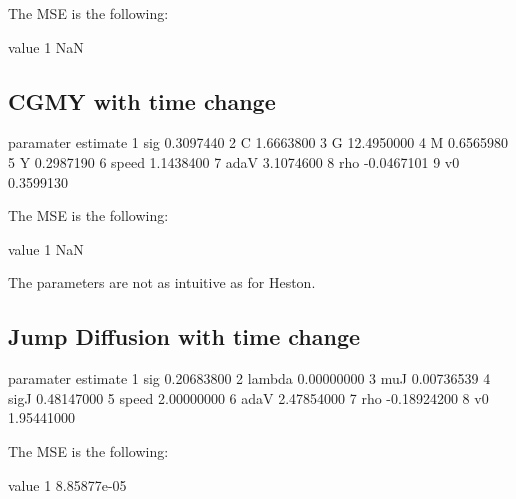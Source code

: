 \documentclass{article}
\begin{document}
The MSE is the following:

\begin{Schunk}
\begin{Soutput}
  value
1   NaN
\end{Soutput}
\end{Schunk}

\subsection{CGMY with time change}

\begin{Schunk}
\begin{Soutput}
  paramater   estimate
1       sig  0.3097440
2         C  1.6663800
3         G 12.4950000
4         M  0.6565980
5         Y  0.2987190
6     speed  1.1438400
7      adaV  3.1074600
8       rho -0.0467101
9        v0  0.3599130
\end{Soutput}
\end{Schunk}
The MSE is the following:

\begin{Schunk}
\begin{Soutput}
  value
1   NaN
\end{Soutput}
\end{Schunk}

The parameters are not as intuitive as for Heston.

\subsection{Jump Diffusion with time change}
\begin{Schunk}
\begin{Soutput}
  paramater    estimate
1       sig  0.20683800
2    lambda  0.00000000
3       muJ  0.00736539
4      sigJ  0.48147000
5     speed  2.00000000
6      adaV  2.47854000
7       rho -0.18924200
8        v0  1.95441000
\end{Soutput}
\end{Schunk}
The MSE is the following:

\begin{Schunk}
\begin{Soutput}
        value
1 8.85877e-05
\end{Soutput}
\end{Schunk}
\end{document}
